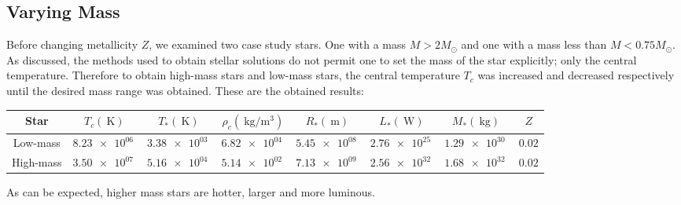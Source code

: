 \documentclass[11pt]{article}
\begin{document}
    \subsection{Varying Mass}
    \label{sec:varyingmass}
    Before changing metallicity $Z$, we examined two case study stars. One with a mass $M > 2 M_\odot$ and one with a mass less than $M <0.75 M_\odot$. As discussed, the methods used to obtain stellar solutions do not permit one to set the mass of the star explicitly; only the central temperature. Therefore to obtain high-mass stars and low-mass stars, the central temperature $T_c$ was increased and decreased respectively until the desired mass range was obtained. These are the obtained results:
    \begin{center}
        \begin{tabular}{|c|c|c|c|c|c|c|c|}
        \hline
        Star & $T_c (\SI{}{\K})$ & $T_* (\SI{}{\K})$ & $\rho_c (\SI{}{\kg \per \m^3})$ & $R_* (\SI{}{\m})$ & $L_* (\SI{}{\W})$ & $M_* (\SI{}{\kg})$ & $Z$\\
        \hline
        Low-mass & $\SI{8.23e+06}{}$ & $\SI{3.38e+03}{}$ & $\SI{6.82e+04}{}$ & $\SI{5.45e+08}{}$ & $\SI{2.76e+25}{}$ & $\SI{1.29e+30}{}$  & $0.02$ \\
        High-mass & $\SI{3.50e+07}{}$ & $\SI{5.16e+04}{}$ & $\SI{5.14e+02}{}$ & $\SI{7.13e+09}{}$ & $\SI{2.56e+32}{}$ & $\SI{1.68e+32}{}$ & $0.02$ \\
        \hline
        \end{tabular}
    \end{center}
    As can be expected, higher mass stars are hotter, larger and more luminous.
\end{document}
